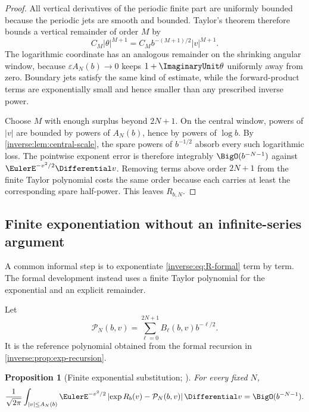 \documentclass[11pt,oneside]{article}
\newtheorem{proposition}[proposition]{Proposition}
\theoremstyle{definition}
\theoremstyle{remark}
\begin{document}
\begin{proof}
All vertical derivatives of the periodic finite part are uniformly
bounded because the periodic jets are smooth and bounded.  Taylor's
theorem therefore bounds a vertical remainder of order $M$ by
\[
 C_M|\theta|^{M+1}
 =C_M b^{-(M+1)/2}|v|^{M+1}.
\]
The logarithmic coordinate has an analogous remainder on the shrinking
angular window, because $\varepsilon A_N(b)\to0$ keeps
$1+\ImaginaryUnit\theta$ uniformly away from zero.  Boundary jets satisfy the same
kind of estimate, while the forward-product terms are exponentially
small and hence smaller than any prescribed inverse power.

Choose $M$ with enough surplus beyond $2N+1$.  On the central window,
powers of $|v|$ are bounded by powers of $A_N(b)$, hence by powers of
$\log b$.  By \cref{inverse:lem:central-scale}, the spare powers of $b^{-1/2}$
absorb every such logarithmic loss.  The pointwise exponent error is
therefore integrably $\BigO(b^{-N-1})$ against
$\EulerE^{-v^2/2}\Differential v$.  Removing terms above order $2N+1$ from the finite
Taylor polynomial costs the same order because each carries at least the
corresponding spare half-power.  This leaves $R_{b,N}$.
\end{proof}

\subsection{Finite exponentiation without an infinite-series argument}

A common informal step is to exponentiate \eqref{inverse:eq:R-formal} term by
term.  The formal development instead uses a finite Taylor polynomial for
the exponential and an explicit remainder.

Let
\[
 \mathcal P_N(b,v)
 =\sum_{\ell=0}^{2N+1}B_\ell(b,v)b^{-\ell/2}.
 \label{inverse:eq:reference-polynomial}
\]
It is the reference polynomial obtained from the formal recursion in
\cref{inverse:prop:exp-recursion}.

\begin{proposition}[Finite exponential substitution; \Formalized]
\label{inverse:prop:finite-exp-substitution}
For every fixed $N$,
\begin{equation}
 \frac1{\sqrt{2\pi}}
 \int_{|v|\leq A_N(b)}
 \EulerE^{-v^2/2}
 \left|\exp R_b(v)-\mathcal P_N(b,v)\right|\Differential v
 =\BigO(b^{-N-1}). \label{inverse:eq:central-reference-error}
\end{equation}
\end{proposition}
\end{document}
